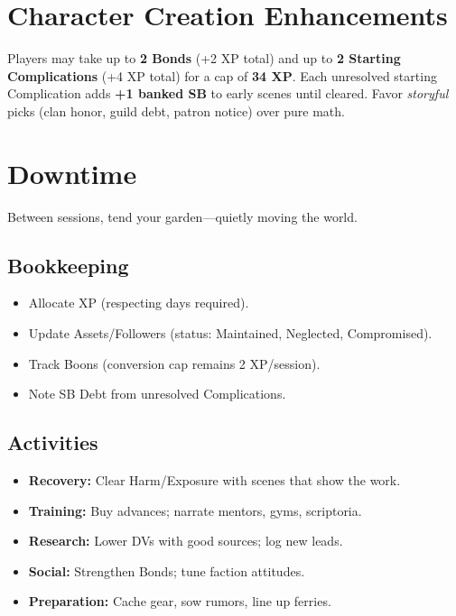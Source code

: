 \begin{multicols}{2}
\section{Character Creation Enhancements}

Players may take up to \textbf{2 Bonds} (+2 XP total) and up to \textbf{2 Starting Complications} (+4 XP total) for a cap of \textbf{34 XP}. Each unresolved starting Complication adds \textbf{+1 banked SB} to early scenes until cleared. Favor \emph{storyful} picks (clan honor, guild debt, patron notice) over pure math.

\section{Downtime}

Between sessions, tend your garden—quietly moving the world.

\subsection{Bookkeeping}
\begin{itemize}
  \item Allocate XP (respecting days required).%
  \item Update Assets/Followers (status: Maintained, Neglected, Compromised).%
  \item Track Boons (conversion cap remains 2 XP/session).%
  \item Note SB Debt from unresolved Complications.%
\end{itemize}

\subsection{Activities}
\begin{itemize}
  \item \textbf{Recovery:} Clear Harm/Exposure with scenes that show the work.%
  \item \textbf{Training:} Buy advances; narrate mentors, gyms, scriptoria.%
  \item \textbf{Research:} Lower DVs with good sources; log new leads.%
  \item \textbf{Social:} Strengthen Bonds; tune faction attitudes.%
  \item \textbf{Preparation:} Cache gear, sow rumors, line up ferries.%
\end{itemize}


\end{multicols}
